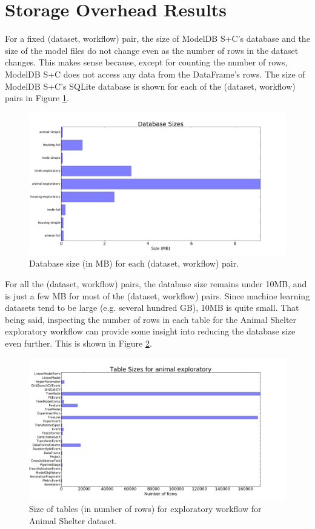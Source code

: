 \section{Storage Overhead Results}
For a fixed (dataset, workflow) pair, the size of ModelDB S+C's database and the size of the
model files do not change even as the number of rows in the dataset changes. This makes sense
because, except for counting the number of rows, ModelDB S+C does not access any data from the
DataFrame's rows. The size of ModelDB S+C's SQLite database is shown for each of the (dataset, workflow)
pairs in Figure \ref{fig:dbsize}.

\begin{figure}
  \centering
  \includegraphics[width=6.0in]{dbsize}
  \caption{
    Database size (in MB) for each (dataset, workflow) pair.
  }
  \label{fig:dbsize}
\end{figure}

For all the (dataset, workflow) pairs, the database size remains under 10MB, and is
just a few MB for most of the (dataset, workflow) pairs. Since machine learning datasets
tend to be large (e.g. several hundred GB), 10MB is quite small. That being said, inspecting
the number of rows in each table for the Animal Shelter exploratory workflow 
can provide some insight into reducing the database size even further. This is shown in Figure
\ref{fig:animal_exploratory_table_sizes}.

\begin{figure}
  \centering
  \includegraphics[width=6.0in]{animal_exploratory_table_sizes}
  \caption{
    Size of tables (in number of rows) for exploratory workflow for Animal
    Shelter dataset.
  }
  \label{fig:animal_exploratory_table_sizes}
\end{figure}

